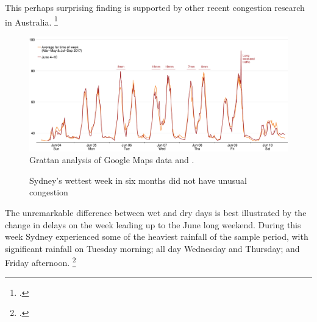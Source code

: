 \documentclass{grattan}
\begin{document}
This perhaps surprising finding is supported by other recent congestion research in Australia.%
    \footcites{Austroads-2016-Congestion-Reliability-Review}{Qld-TMR-2016-Understanding-causes-of-congestion}

\begin{figure}
\caption{Sydney's wettest week in six months did not have unusual congestion}\label{fig:sydney-commutes-early-june-rain}
\includegraphics[width=\textwidth]{atlas/Liverpool-June-week-1.pdf}
%
{Grattan analysis of Google Maps data and \textcite{Bom-Data}.}
\end{figure}


The unremarkable difference between wet and dry days is best illustrated by the change in delays on the week leading up to the June long weekend. During this week Sydney experienced some of the heaviest rainfall of the sample period, with significant rainfall on Tuesday morning; all day Wednesday and Thursday; and Friday afternoon.
\footcite{Bom-Data}
\end{document}
